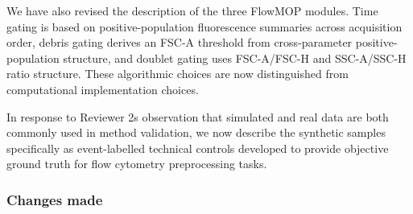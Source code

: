 \documentclass[
  11pt,
  a4paper,
]{article}
\begin{document}
We have also revised the description of the three FlowMOP modules. Time
gating is based on positive-population fluorescence summaries across
acquisition order, debris gating derives an FSC-A threshold from
cross-parameter positive-population structure, and doublet gating uses
FSC-A/FSC-H and SSC-A/SSC-H ratio structure. These algorithmic choices
are now distinguished from computational implementation choices.

In response to Reviewer 2\textquotesingle s observation that simulated
and real data are both commonly used in method validation, we now
describe the synthetic samples specifically as event-labelled technical
controls developed to provide objective ground truth for flow cytometry
preprocessing tasks.

\subsubsection{Changes made}\label{changes-made}
\end{document}
